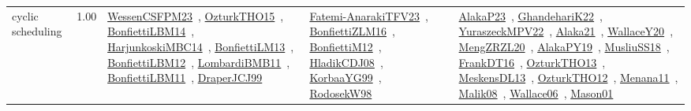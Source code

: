 {\begin{longtable}{p{3cm}r>{\raggedright\arraybackslash}p{6cm}>{\raggedright\arraybackslash}p{6cm}>{\raggedright\arraybackslash}p{8cm}}
\index{cyclic scheduling}\index{Concepts!cyclic scheduling}cyclic scheduling &  1.00 & \href{../works/WessenCSFPM23.pdf}{WessenCSFPM23}~\cite{WessenCSFPM23}, \href{../works/OzturkTHO15.pdf}{OzturkTHO15}~\cite{OzturkTHO15}, \href{../works/BonfiettiLBM14.pdf}{BonfiettiLBM14}~\cite{BonfiettiLBM14}, \href{../works/HarjunkoskiMBC14.pdf}{HarjunkoskiMBC14}~\cite{HarjunkoskiMBC14}, \href{../works/BonfiettiLM13.pdf}{BonfiettiLM13}~\cite{BonfiettiLM13}, \href{../works/BonfiettiLBM12.pdf}{BonfiettiLBM12}~\cite{BonfiettiLBM12}, \href{../works/LombardiBMB11.pdf}{LombardiBMB11}~\cite{LombardiBMB11}, \href{../works/BonfiettiLBM11.pdf}{BonfiettiLBM11}~\cite{BonfiettiLBM11}, \href{../works/DraperJCJ99.pdf}{DraperJCJ99}~\cite{DraperJCJ99} & \href{../works/Fatemi-AnarakiTFV23.pdf}{Fatemi-AnarakiTFV23}~\cite{Fatemi-AnarakiTFV23}, \href{../works/BonfiettiZLM16.pdf}{BonfiettiZLM16}~\cite{BonfiettiZLM16}, \href{../works/BonfiettiM12.pdf}{BonfiettiM12}~\cite{BonfiettiM12}, \href{../works/HladikCDJ08.pdf}{HladikCDJ08}~\cite{HladikCDJ08}, \href{../works/KorbaaYG99.pdf}{KorbaaYG99}~\cite{KorbaaYG99}, \href{../works/RodosekW98.pdf}{RodosekW98}~\cite{RodosekW98} & \href{../works/AlakaP23.pdf}{AlakaP23}~\cite{AlakaP23}, \href{../works/GhandehariK22.pdf}{GhandehariK22}~\cite{GhandehariK22}, \href{../works/YuraszeckMPV22.pdf}{YuraszeckMPV22}~\cite{YuraszeckMPV22}, \href{../works/Alaka21.pdf}{Alaka21}~\cite{Alaka21}, \href{../works/WallaceY20.pdf}{WallaceY20}~\cite{WallaceY20}, \href{../works/MengZRZL20.pdf}{MengZRZL20}~\cite{MengZRZL20}, \href{../works/AlakaPY19.pdf}{AlakaPY19}~\cite{AlakaPY19}, \href{../works/MusliuSS18.pdf}{MusliuSS18}~\cite{MusliuSS18}, \href{../works/FrankDT16.pdf}{FrankDT16}~\cite{FrankDT16}, \href{../works/OzturkTHO13.pdf}{OzturkTHO13}~\cite{OzturkTHO13}, \href{../works/MeskensDL13.pdf}{MeskensDL13}~\cite{MeskensDL13}, \href{../works/OzturkTHO12.pdf}{OzturkTHO12}~\cite{OzturkTHO12}, \href{../works/Menana11.pdf}{Menana11}~\cite{Menana11}, \href{../works/Malik08.pdf}{Malik08}~\cite{Malik08}, \href{../works/Wallace06.pdf}{Wallace06}~\cite{Wallace06}, \href{../works/Mason01.pdf}{Mason01}~\cite{Mason01}\\

\end{longtable}}

